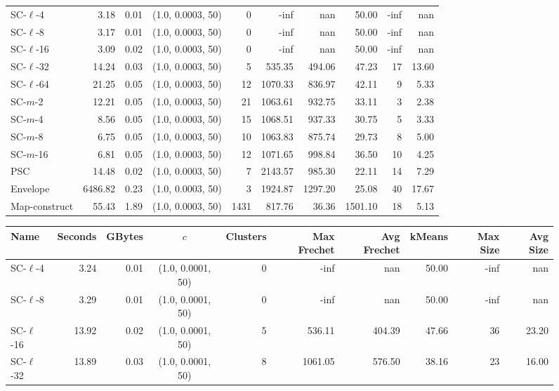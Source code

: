 \documentclass[11pt]{article}
\begin{document}
\begin{figure}
\begin{center}
\begin{minipage}{\textwidth}
{\begin{tabular}{@{}lrrcrrrrrr@{}}
        \midrule
        SC-$\ell$-4 & 3.18 & 0.01 & (1.0, 0.0003, 50) & 0 & -inf & nan & 50.00 & -inf & nan\\
        SC-$\ell$-8 & 3.17 & 0.01 & (1.0, 0.0003, 50) & 0 & -inf & nan & 50.00 & -inf & nan\\
        SC-$\ell$-16 & 3.09 & 0.02 & (1.0, 0.0003, 50) & 0 & -inf & nan & 50.00 & -inf & nan\\
        SC-$\ell$-32 & 14.24 & 0.03 & (1.0, 0.0003, 50) & 5 & 535.35 & 494.06 & 47.23 & 17 & 13.60\\
        SC-$\ell$-64 & 21.25 & 0.05 & (1.0, 0.0003, 50) & 12 & 1070.33 & 836.97 & 42.11 & 9 & 5.33\\
        SC-$m$-2 & 12.21 & 0.05 & (1.0, 0.0003, 50) & 21 & 1063.61 & 932.75 & 33.11 & 3 & 2.38\\
        SC-$m$-4 & 8.56 & 0.05 & (1.0, 0.0003, 50) & 15 & 1068.51 & 937.33 & 30.75 & 5 & 3.33\\
        SC-$m$-8 & 6.75 & 0.05 & (1.0, 0.0003, 50) & 10 & 1063.83 & 875.74 & 29.73 & 8 & 5.00\\
        SC-$m$-16 & 6.81 & 0.05 & (1.0, 0.0003, 50) & 12 & 1071.65 & 998.84 & 36.50 & 10 & 4.25\\
        PSC & 14.48 & 0.02 & (1.0, 0.0003, 50) & 7 & 2143.57 & 985.30 & 22.11 & 14 & 7.29\\
        Envelope & 6486.82 & 0.23 & (1.0, 0.0003, 50) & 3 & 1924.87 & 1297.20 & 25.08 & 40 & 17.67\\
        Map-construct & 55.43 & 1.89 & (1.0, 0.0003, 50) & 1431 & 817.76 & 36.36 & 1501.10 & 18 & 5.13\\
        \bottomrule
    \end{tabular}
    }
    {
    \begin{tabular}{@{}lrrcrrrrrr@{}}
        \toprule
        Name & Seconds & GBytes & $c$ & Clusters & Max Frechet & Avg Frechet & kMeans & Max Size & Avg Size\\
        \midrule
        SC-$\ell$-4 & 3.24 & 0.01 & (1.0, 0.0001, 50) & 0 & -inf & nan & 50.00 & -inf & nan\\
        SC-$\ell$-8 & 3.29 & 0.01 & (1.0, 0.0001, 50) & 0 & -inf & nan & 50.00 & -inf & nan\\
        SC-$\ell$-16 & 13.92 & 0.02 & (1.0, 0.0001, 50) & 5 & 536.11 & 404.39 & 47.66 & 36 & 23.20\\
        SC-$\ell$-32 & 13.89 & 0.03 & (1.0, 0.0001, 50) & 8 & 1061.05 & 576.50 & 38.16 & 23 & 16.00\\

\end{tabular}}
\end{minipage}
\end{center}
\end{figure}
\end{document}
